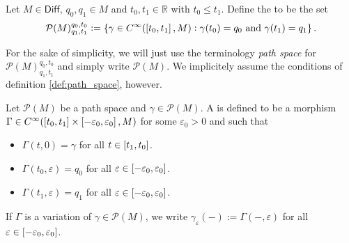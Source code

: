 \begin{definition}
	\label{def:path_space}
	Let $M \in \mathsf{Diff}$, $q_0,q_1 \in M$ and $t_0, t_1 \in \mathbb{R}$ with $t_0 \leq t_1$. Define the  to be the set
	\begin{equation}
		\label{eq:path_space}
		\mathcal{P}(M)^{q_0,t_0}_{q_1,t_1} := \cbr[0]{\gamma \in C^\infty(\intcc[0]{t_0,t_1},M) : \gamma(t_0) = q_0 \text{ and } \gamma(t_1) = q_1}.
	\end{equation}
\end{definition}

\begin{remark}
	For the sake of simplicity, we will just use the terminology \emph{path space} for $\mathcal{P}(M)^{q_0,t_0}_{q_1,t_1}$ and simply write $\mathcal{P}(M)$. We implicitely assume the conditions of definition \ref{def:path_space}, however.
\end{remark}

\begin{definition}[Variation]
	\label{def:variation}
	Let $\mathcal{P}(M)$ be a path space and $\gamma \in \mathcal{P}(M)$. A  is defined to be a morphism $\Gamma \in C^\infty(\intcc[0]{t_0,t_1} \times \intcc[0]{-\varepsilon_0,\varepsilon_0},M)$ for some $\varepsilon_0 > 0$ and such that
	\begin{itemize}[wide=0pt]
		\item $\Gamma(t,0) = \gamma$ for all $t \in \intcc[0]{t_1,t_0}$.
		\item $\Gamma(t_0,\varepsilon) = q_0$ for all $\varepsilon \in \intcc[0]{-\varepsilon_0,\varepsilon_0}$.
		\item $\Gamma(t_1,\varepsilon) = q_1$ for all $\varepsilon \in \intcc[0]{-\varepsilon_0,\varepsilon_0}$.
	\end{itemize}
\end{definition}

\begin{remark}
	If $\Gamma$ is a variation of $\gamma \in \mathcal{P}(M)$, we write $\gamma_\varepsilon(-) := \Gamma(-,\varepsilon)$ for all $\varepsilon \in \intcc[0]{-\varepsilon_0,\varepsilon_0}$.
\end{remark}

